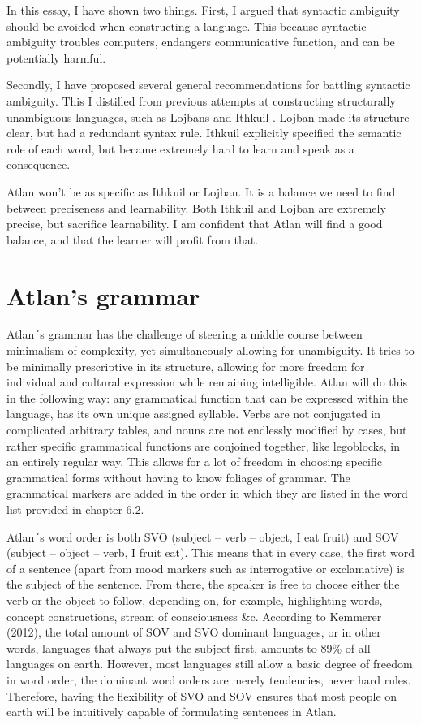 In this essay, I have shown two things. First, I argued that syntactic ambiguity should be avoided when constructing a language. This because syntactic ambiguity troubles computers, endangers communicative function, and  can be potentially harmful. 

Secondly, I have proposed several general recommendations for battling syntactic ambiguity. This I distilled from previous attempts at constructing structurally unambiguous languages, such as Lojbans and Ithkuil . Lojban made its structure clear, but had a redundant syntax rule. Ithkuil explicitly specified the semantic role of each word, but became extremely hard to learn and speak as a consequence. 

Atlan won't be as specific as Ithkuil or Lojban. It is a balance we need to find between preciseness and learnability. Both Ithkuil and Lojban are extremely precise, but sacrifice learnability. I am confident that Atlan will find a good balance, and that the learner will profit from that. 


\section{Atlan's grammar}


Atlan´s grammar has the challenge of steering a middle course between minimalism of complexity, yet simultaneously allowing for unambiguity. It tries to be minimally prescriptive in its structure, allowing for more freedom for individual and cultural expression while remaining intelligible. Atlan will do this in the following way: any grammatical function that can be expressed within the language, has its own unique assigned syllable. Verbs are not conjugated in complicated arbitrary tables, and nouns are not endlessly modified by cases, but rather specific grammatical functions are conjoined together, like legoblocks, in an entirely regular way. This allows for a lot of freedom in choosing specific grammatical forms without having to know foliages of grammar. The grammatical markers are added in the order in which they are listed in the word list provided in chapter 6.2.  

Atlan´s word order is both SVO (subject – verb – object, I eat fruit) and SOV (subject – object – verb, I fruit eat). This means that in every case, the first word of a sentence (apart from mood markers such as interrogative or exclamative) is the subject of the sentence. From there, the speaker is free to choose either the verb or the object to follow, depending on, for example, highlighting words, concept constructions, stream of consciousness \&c. According to Kemmerer (2012), the total amount of SOV and SVO dominant languages, or in other words, languages that always put the subject first, amounts to 89\% of all languages on earth. However, most languages still allow a basic degree of freedom in word order, the dominant word orders are merely tendencies, never hard rules. Therefore, having the flexibility of SVO and SOV ensures that most people on earth will be intuitively capable of formulating sentences in Atlan. 

